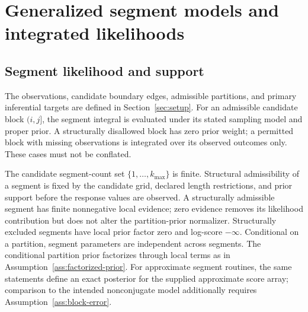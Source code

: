 \section{Generalized segment models and integrated likelihoods}
\label{sec:model}



\subsection{Segment likelihood and support}
The observations, candidate boundary edges, admissible partitions, and primary
inferential targets are defined in Section~\ref{sec:setup}. For an admissible
candidate block $(i,j]$, the segment integral is evaluated under its stated
sampling model and proper prior. A structurally disallowed block has zero
prior weight; a permitted block with missing observations is integrated over
its observed outcomes only. These cases must not be conflated.

\begin{assumption}
\label{ass:offline}
The candidate segment-count set $\{1,\ldots,k_{\max}\}$ is finite. Structural admissibility of a segment is fixed by the candidate grid, declared length restrictions, and prior support before the response values are observed. A structurally admissible segment has finite nonnegative local evidence; zero evidence removes its likelihood contribution but does not alter the partition-prior normalizer. Structurally excluded segments have local prior factor zero and log-score $-\infty$. Conditional on a partition, segment parameters are independent across segments. The conditional partition prior factorizes through local terms as in Assumption~\ref{ass:factorized-prior}. For approximate segment routines, the same statements define an exact posterior for the supplied approximate score array; comparison to the intended nonconjugate model additionally requires Assumption~\ref{ass:block-error}.
\end{assumption}

